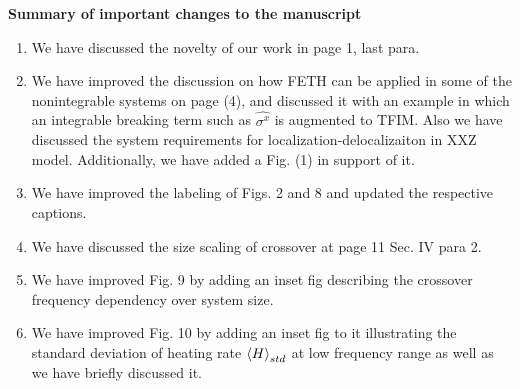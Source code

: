\documentclass[aps,prb,reprint,showpacs,floatfix,superscriptaddress, onecolumn, nofootinbib, 9pt]{revtex4-2}
\begin{document}
	\vskip 1cm 
	\noindent \textbf{Summary of important changes to the  manuscript}
	\begin{enumerate}
		\item We have discussed the novelty of our work in page 1, last para.
		\item We have improved the discussion on how FETH can be applied in some of the nonintegrable systems on page (4), and discussed it with an example in which an integrable breaking term such as $\hat{\sigma^x}$ is augmented to TFIM. Also we have discussed the system requirements for localization-delocalizaiton in XXZ model.  Additionally, we have added a Fig. (1) in support of it.
		\item We have improved the labeling of Figs. 2 and 8 and updated the respective captions.
		\item We have discussed the size scaling of crossover at page 11 Sec. IV para 2.
		\item We have improved Fig. 9 by adding an inset fig describing the crossover frequency dependency over system size.
		\item We have improved Fig. 10 by adding an inset fig to it illustrating the standard deviation of heating rate $\expval{H}_{std}$ at low frequency range as well as we have briefly discussed it. 
	\end{enumerate}
	
	
	
	
\end{document}
